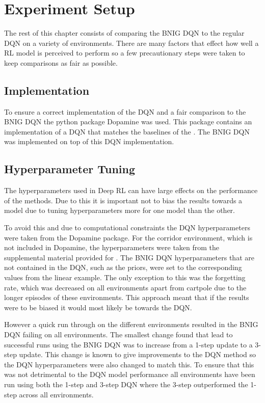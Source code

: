 \section{Experiment Setup}

The rest of this chapter consists of comparing the BNIG DQN to the regular DQN on a variety of environments. There are many factors that effect how well a RL model is perceived to perform so a few precautionary steps were taken to keep comparisons as fair as possible. 

\subsection{Implementation}

To ensure a correct implementation of the DQN and a fair comparison to the BNIG DQN the python package Dopamine \citep{castro_18} was used. This package contains an implementation of a DQN that matches the baselines of the \cite{mnih_2015}. The BNIG DQN was implemented on top of this DQN implementation.

\subsection{Hyperparameter Tuning}

The hyperparameters used in Deep RL can have large effects on the performance of the methods. Due to this it is important not to bias the results towards a model due to tuning hyperparameters more for one model than the other. 

To avoid this and due to computational constraints the DQN hyperparameters were taken from the Dopamine package. For the corridor environment, which is not included in Dopamine, the hyperparameters were taken from the supplemental material provided for \cite{osband_2018}. The BNIG DQN hyperparameters that are not contained in the DQN, such as the priors, were set to the corresponding values from the linear example. The only exception to this was the forgetting rate, which was decreased on all environments apart from cartpole due to the longer episodes of these environments. This approach meant that if the results were to be biased it would most likely be towards the DQN.

However a quick run through on the different environments resulted in the BNIG DQN failing on all environments. The smallest change found that lead to successful runs using the BNIG DQN was to increase from a 1-step update to a 3-step update. This change is known to give improvements to the DQN method \citep{hessel_2017} so the DQN hyperparameters were also changed to match this. To ensure that this was not detrimental to the DQN model performance all environments have been run using both the 1-step and 3-step DQN where the 3-step outperformed the 1-step across all environments.

